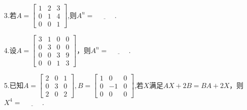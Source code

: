 \documentclass{article}
\begin{document}
  3.若$
  A=
  \begin{bmatrix}
   1 & 2 & 3\\
   0& 1&4\\
   0& 0&1
  \end{bmatrix}
  $,则$A^{n}=\underline{~~~~~~~~~~~~~}.$

  4.设$A=
  \begin{bmatrix}
 3&1&0&0\\
 0&3&0&0\\
 0&0&3&9\\
 0&0&1&3
  \end{bmatrix}
  $，则$A^{n}=\underline{~~~~~~~~~~~~~}.$

  5.已知$
  A=
  \begin{bmatrix}
    2&0&1\\
    0&3&0\\
    2&0&2
  \end{bmatrix},
  B=
  \begin{bmatrix}
    1&0&0\\
    0&-1&0\\
    0&0&0
  \end{bmatrix}
  $,若$X$满足$AX+2B=BA+2X$，则$X^{4}=\underline{~~~~~~~~~~~~~}.$
\end{document}
